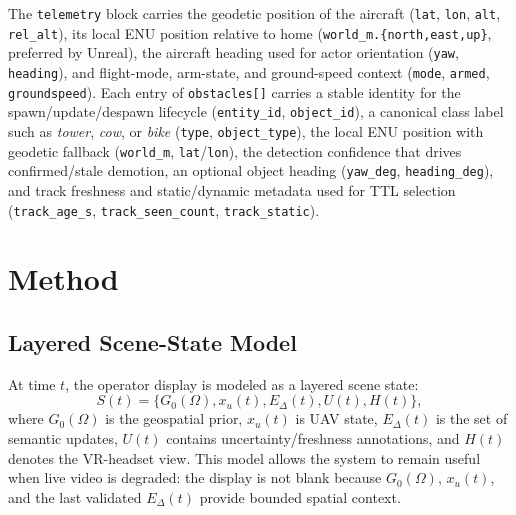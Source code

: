 \documentclass[fleqn]{VRIH2025}
\newcommand{\code}[1]{\texttt{#1}}
\begin{document}
The \code{telemetry} block carries the geodetic position of the aircraft (\code{lat}, \code{lon}, \code{alt}, \code{rel\_alt}), its local ENU position relative to home (\code{world\_m.\{north,east,up\}}, preferred by Unreal), the aircraft heading used for actor orientation (\code{yaw}, \code{heading}), and flight-mode, arm-state, and ground-speed context (\code{mode}, \code{armed}, \code{groundspeed}). Each entry of \code{obstacles[]} carries a stable identity for the spawn/update/despawn lifecycle (\code{entity\_id}, \code{object\_id}), a canonical class label such as \textit{tower}, \textit{cow}, or \textit{bike} (\code{type}, \code{object\_type}), the local ENU position with geodetic fallback (\code{world\_m}, \code{lat}/\code{lon}), the detection confidence that drives confirmed/stale demotion, an optional object heading (\code{yaw\_deg}, \code{heading\_deg}), and track freshness and static/dynamic metadata used for TTL selection (\code{track\_age\_s}, \code{track\_seen\_count}, \code{track\_static}).

\section{Method}

\subsection{Layered Scene-State Model}
\label{sec:scene-state}
At time \(t\), the operator display is modeled as a layered scene state:
\begin{equation}
S(t) = \{G_0(\Omega), x_u(t), E_{\Delta}(t), U(t), H(t)\},
\end{equation}
where \(G_0(\Omega)\) is the geospatial prior, \(x_u(t)\) is UAV state, \(E_{\Delta}(t)\) is the set of semantic updates, \(U(t)\) contains uncertainty/freshness annotations, and \(H(t)\) denotes the VR-headset view. This model allows the system to remain useful when live video is degraded: the display is not blank because \(G_0(\Omega)\), \(x_u(t)\), and the last validated \(E_{\Delta}(t)\) provide bounded spatial context.
\end{document}
